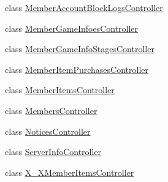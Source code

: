 \begin{DoxyCompactItemize}
\item 
class \hyperlink{class_cloud_bread_admin_web_1_1_controllers_1_1_member_account_block_logs_controller}{Member\+Account\+Block\+Logs\+Controller}
\item 
class \hyperlink{class_cloud_bread_admin_web_1_1_controllers_1_1_member_game_infoes_controller}{Member\+Game\+Infoes\+Controller}
\item 
class \hyperlink{class_cloud_bread_admin_web_1_1_controllers_1_1_member_game_info_stages_controller}{Member\+Game\+Info\+Stages\+Controller}
\item 
class \hyperlink{class_cloud_bread_admin_web_1_1_controllers_1_1_member_item_purchases_controller}{Member\+Item\+Purchases\+Controller}
\item 
class \hyperlink{class_cloud_bread_admin_web_1_1_controllers_1_1_member_items_controller}{Member\+Items\+Controller}
\item 
class \hyperlink{class_cloud_bread_admin_web_1_1_controllers_1_1_members_controller}{Members\+Controller}
\item 
class \hyperlink{class_cloud_bread_admin_web_1_1_controllers_1_1_notices_controller}{Notices\+Controller}
\item 
class \hyperlink{class_cloud_bread_admin_web_1_1_controllers_1_1_server_info_controller}{Server\+Info\+Controller}
\item 
class \hyperlink{class_cloud_bread_admin_web_1_1_controllers_1_1_x___x_member_items_controller}{X\+\_\+\+X\+Member\+Items\+Controller}
\end{DoxyCompactItemize}
